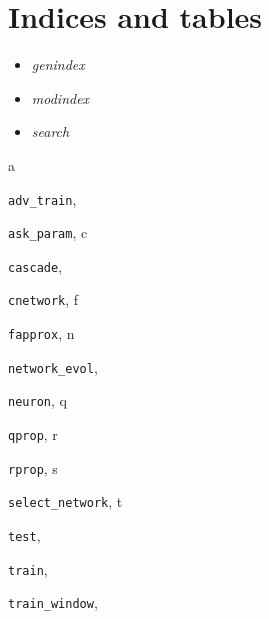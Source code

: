 \documentclass[letterpaper,10pt,english]{sphinxmanual}
\begin{document}
\chapter{Indices and tables}
\label{index:indices-and-tables}\label{index:welcome-to-neuron-s-documentation}\begin{itemize}
\item {} 
\emph{genindex}

\item {} 
\emph{modindex}

\item {} 
\emph{search}

\end{itemize}


\renewcommand{\indexname}{Python Module Index}
\begin{theindex}
\def\bigletter#1{{\Large\sffamily#1}\nopagebreak\vspace{1mm}}
\bigletter{a}
\item {\texttt{adv\_train}}, \pageref{index:module-adv_train}
\item {\texttt{ask\_param}}, \pageref{index:module-ask_param}
\indexspace
\bigletter{c}
\item {\texttt{cascade}}, \pageref{index:module-cascade}
\item {\texttt{cnetwork}}, \pageref{index:module-cnetwork}
\indexspace
\bigletter{f}
\item {\texttt{fapprox}}, \pageref{index:module-fapprox}
\indexspace
\bigletter{n}
\item {\texttt{network\_evol}}, \pageref{index:module-network_evol}
\item {\texttt{neuron}}, \pageref{index:module-neuron}
\indexspace
\bigletter{q}
\item {\texttt{qprop}}, \pageref{index:module-qprop}
\indexspace
\bigletter{r}
\item {\texttt{rprop}}, \pageref{index:module-rprop}
\indexspace
\bigletter{s}
\item {\texttt{select\_network}}, \pageref{index:module-select_network}
\indexspace
\bigletter{t}
\item {\texttt{test}}, \pageref{index:module-test}
\item {\texttt{train}}, \pageref{index:module-train}
\item {\texttt{train\_window}}, \pageref{index:module-train_window}
\end{theindex}

\renewcommand{\indexname}{Index}
\printindex
\end{document}
